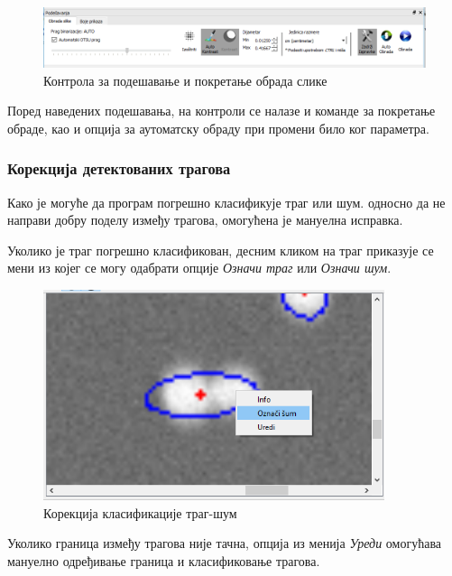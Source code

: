 \documentclass[11pt,a4paper,serbian,oneside]{book}
\begin{document}
\begin{figure}[H]
\begin{center}
\includegraphics[width=150mm]{images/processing.png}
\end{center}
\caption{Контрола за подешавање и покретање обрада слике}
\label{fig:processing}
\end{figure}

Поред наведених подешавања, на контроли се налазе и команде за покретање об\-ра\-де, као и опција за аутоматску обраду при промени било ког параметра.

\subsubsection{Корекција детектованих трагова}

Како је могуће да програм погрешно класификује траг или шум. односно да не направи добру поделу између трагова, омогућена је мануелна исправка.

Уколико је траг погрешно класификован, десним кликом на траг приказује се мени из којег се могу одабрати опције \textit{Означи траг} или \textit{Означи шум}.

\begin{figure}[H]
\begin{center}
\includegraphics[width=100mm]{images/oznaci.png}
\end{center}
\caption{Корекција класификације траг-шум}
\label{fig:mark}
\end{figure}

Уколико граница између трагова није тачна, опција из менија \textit{Уреди} омогућава мануелно одређивање граница и класификовање трагова.
\end{document}
